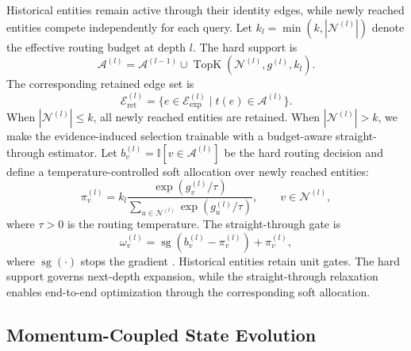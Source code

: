 \documentclass[a4paper,fleqn]{cas-sc}
\begin{document}
Historical entities remain active through their identity edges, while newly
reached entities compete independently for each query. Let
$k_l=\min(k,|\mathcal{N}^{(l)}|)$ denote the effective routing budget at depth
$l$. The hard support is
\begin{equation}
\mathcal{A}^{(l)}
=
\mathcal{A}^{(l-1)}
\cup
\operatorname{TopK}\!\left(\mathcal{N}^{(l)},g^{(l)},k_l\right).
\label{eq:active_support}
\end{equation}
The corresponding retained edge set is
\begin{equation}
\mathcal{E}_{\mathrm{ret}}^{(l)}
=
\{e\in\mathcal{E}_{\mathrm{exp}}^{(l)}
\mid t(e)\in\mathcal{A}^{(l)}\}.
\label{eq:retained_edges}
\end{equation}
When $|\mathcal{N}^{(l)}|\leq k$, all newly reached entities are retained. When
$|\mathcal{N}^{(l)}|>k$, we make the evidence-induced selection trainable with
a budget-aware straight-through estimator. Let
$b_v^{(l)}=\mathbb{I}[v\in\mathcal{A}^{(l)}]$ be the hard routing decision and
define a temperature-controlled soft allocation over newly reached entities:
\begin{equation}
\pi_v^{(l)}
=
k_l
\frac{\exp(g_v^{(l)}/\tau)}
{\sum_{u\in\mathcal{N}^{(l)}}\exp(g_u^{(l)}/\tau)},
\qquad v\in\mathcal{N}^{(l)},
\label{eq:routing_relaxation}
\end{equation}
where $\tau>0$ is the routing temperature. The straight-through gate is
\begin{equation}
\omega_v^{(l)}
=
\operatorname{sg}\!\left(b_v^{(l)}-\pi_v^{(l)}\right)+\pi_v^{(l)},
\label{eq:routing_gate}
\end{equation}
where $\operatorname{sg}(\cdot)$ stops the gradient
\citep{bengio2013estimating}. Historical entities retain unit gates. The hard
support governs next-depth expansion, while the straight-through relaxation
enables end-to-end optimization through the corresponding soft allocation.

\subsection{Momentum-Coupled State Evolution}\label{subsec:momentum_module}
\end{document}
